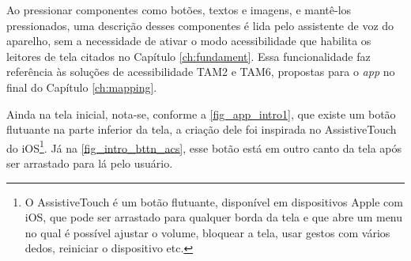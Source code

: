 Ao pressionar componentes como botões, textos e imagens, e mantê-los pressionados, uma descrição desses
componentes é lida pelo assistente de voz do aparelho, sem a necessidade de ativar o modo acessibilidade
que habilita os leitores de tela citados no Capítulo \ref{ch:fundament}. Essa funcionalidade faz referência
às soluções de acessibilidade TAM2 e TAM6, propostas para o \emph{app} no final do Capítulo \ref{ch:mapping}.

Ainda na tela inicial, nota-se, conforme a \autoref{fig_app_intro1}, que existe um botão flutuante na parte inferior
da tela, a criação dele foi inspirada no AssistiveTouch do iOS\footnote{O AssistiveTouch é um botão flutuante,
    disponível em dispositivos Apple com iOS, que pode ser arrastado para qualquer borda da tela e que abre
    um menu no qual é possível ajustar o volume, bloquear a tela, usar gestos com vários dedos, reiniciar o
    dispositivo etc.}. Já na \autoref{fig_intro_bttn_acs}, esse botão está em outro canto da tela após ser
arrastado para lá pelo usuário.

